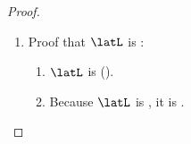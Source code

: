 \begin{proof}
\begin{enumerate}

  \item Proof that $\latL$ is :
    \begin{enumerate}
      \item $\latL$ is  ().
      \item Because $\latL$ is , it is .
    \end{enumerate}
\end{enumerate}
\end{proof}




